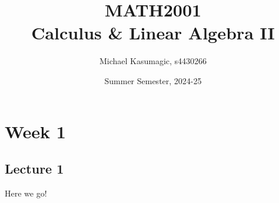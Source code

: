 \documentclass{report}
\title{\Huge{MATH2001}\\Calculus \& Linear Algebra II}
\author{\huge{Michael Kasumagic, s4430266}}
\date{\huge{Summer Semester, 2024-25}}
\begin{document}
\maketitle
\newpage%
\tableofcontents
\pagebreak

\chapter{Week 1}
\section{Lecture 1}
Here we go!
\end{document}
